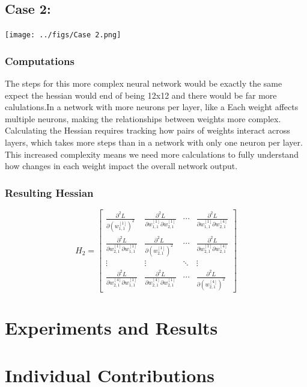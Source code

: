 \documentclass{article}
\begin{document}
\subsection{Case 2:}

\texttt{[image: ../figs/Case 2.png]} \\[0.5cm]

\subsubsection{Computations}

The steps for this more complex neural network would be exactly the same expect the hessian would end of being 12x12 and there would be far more calulations.In a network with more neurons per layer, like a Each weight affects multiple neurons, making the relationships between weights more complex. Calculating the Hessian requires tracking how pairs of weights interact across layers, which takes more steps than in a network with only one neuron per layer. This increased complexity means we need more calculations to fully understand how changes in each weight impact the overall network output.

\subsubsection{Resulting Hessian}
\[
H_2 = \begin{bmatrix}
\frac{\partial^2 L}{\partial (w_{1,1}^{[1]})^2} & \frac{\partial^2 L}{\partial w_{1,1}^{[1]} \partial w_{2,1}^{[1]}} & \cdots & \frac{\partial^2 L}{\partial w_{1,1}^{[1]} \partial w_{2,1}^{[4]}} \\
\frac{\partial^2 L}{\partial w_{2,1}^{[1]} \partial w_{1,1}^{[1]}} & \frac{\partial^2 L}{\partial (w_{2,1}^{[1]})^2} & \cdots & \frac{\partial^2 L}{\partial w_{2,1}^{[1]} \partial w_{2,1}^{[4]}} \\
\vdots & \vdots & \ddots & \vdots \\
\frac{\partial^2 L}{\partial w_{2,1}^{[4]} \partial w_{1,1}^{[1]}} & \frac{\partial^2 L}{\partial w_{2,1}^{[4]} \partial w_{2,1}^{[1]}} & \cdots & \frac{\partial^2 L}{\partial (w_{2,1}^{[4]})^2}
\end{bmatrix}
\]
\section*{Experiments and Results}

\section*{Individual Contributions}
\end{document}
